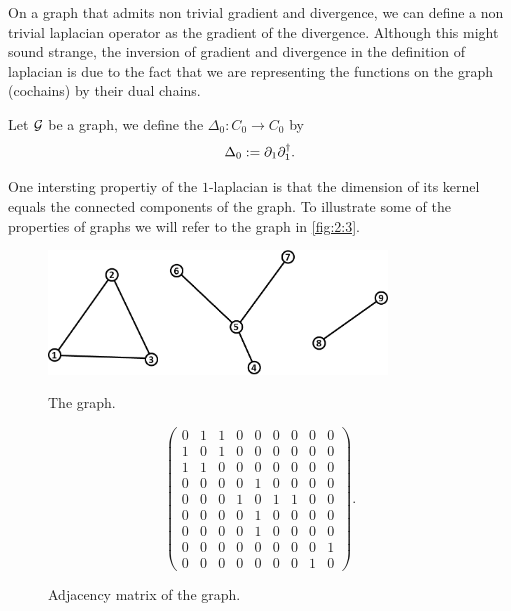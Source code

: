 \documentclass[../2.tex]{subfiles}
\begin{document}


    On a graph that admits non trivial gradient and divergence, we can define a non trivial laplacian operator as the gradient of the divergence.
    Although this might sound strange, the inversion of gradient and divergence in the definition of laplacian is due to the fact that we are representing
    the functions on the graph (cochains) by their dual chains.

    \begin{defn}
        Let $\mathcal{G}$ be a graph, we define the  $\Delta_0 : C_0 \to C_0$ by 
        \[ \Delta_0 := \partial_1 \partial^\dagger_1.\]
    \end{defn}

    One intersting propertiy of the $1$-laplacian is that the dimension of its kernel equals the connected components of the graph.
    To illustrate some of the properties of graphs we will refer to the graph in \autoref{fig:2:3}.

    \begin{figure}[H]
        \begin{minipage}{.5\textwidth}
            \centering
            \includegraphics[width=9cm]{sections/2/graphex}
            \caption{The graph.}
            \label{fig:2:3}
        \end{minipage}
        \begin{minipage}{.5\textwidth}
            \centering
            \[\begin{pmatrix}
                0 & 1 & 1 & 0 & 0 & 0 & 0 & 0 & 0 \\
                1 & 0 & 1 & 0 & 0 & 0 & 0 & 0 & 0 \\
                1 & 1 & 0 & 0 & 0 & 0 & 0 & 0 & 0 \\
                0 & 0 & 0 & 0 & 1 & 0 & 0 & 0 & 0 \\
                0 & 0 & 0 & 1 & 0 & 1 & 1 & 0 & 0 \\
                0 & 0 & 0 & 0 & 1 & 0 & 0 & 0 & 0 \\
                0 & 0 & 0 & 0 & 1 & 0 & 0 & 0 & 0 \\
                0 & 0 & 0 & 0 & 0 & 0 & 0 & 0 & 1 \\
                0 & 0 & 0 & 0 & 0 & 0 & 0 & 1 & 0
            \end{pmatrix}. \]
            \caption{Adjacency matrix of the graph.}
            \label{fig:2:4}
        \end{minipage}
    \end{figure}
\end{document}
